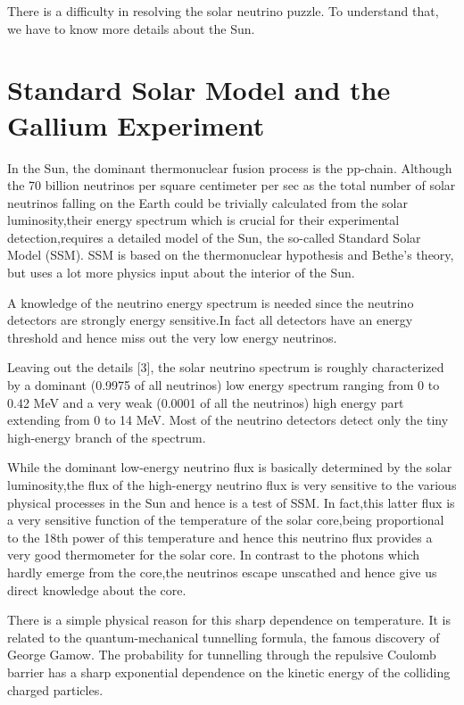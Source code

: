 There is a difficulty in resolving the solar neutrino puzzle. To understand
that, we have to know more details about the Sun.

\newpage

\section{Standard Solar Model and the Gallium Experiment}

In the Sun, the dominant thermonuclear fusion process is the pp-chain.
Although the 70 billion neutrinos per square centimeter per sec as the total
number of solar neutrinos falling on the Earth could be trivially calculated
from the solar luminosity,their energy spectrum which is crucial for their
experimental detection,requires a detailed model of the Sun, the so-called
Standard Solar Model (SSM). SSM is based on the thermonuclear hypothesis
and Bethe’s theory, but uses a lot more physics input about the interior of
the Sun.

A knowledge of the neutrino energy spectrum is needed since the neutrino
detectors are strongly energy sensitive.In fact all detectors have an energy
threshold and hence miss out the very low energy neutrinos.

Leaving out the details [3], the solar neutrino spectrum is roughly characterized by a dominant (0.9975 of all neutrinos) low energy spectrum ranging
from 0 to 0.42 MeV and a very weak (0.0001 of all the neutrinos) high energy
part extending from 0 to 14 MeV. Most of the neutrino detectors detect only
the tiny high-energy branch of the spectrum.

While the dominant low-energy neutrino flux is basically determined by
the solar luminosity,the flux of the high-energy neutrino flux is very sensitive
to the various physical processes in the Sun and hence is a test of SSM.
In fact,this latter flux is a very sensitive function of the temperature of the
solar core,being proportional to the 18th power of this temperature and hence
this neutrino flux provides a very good thermometer for the solar core. In
contrast to the photons which hardly emerge from the core,the neutrinos
escape unscathed and hence give us direct knowledge about the core.

There is a simple physical reason for this sharp dependence on temperature. It is related to the quantum-mechanical tunnelling formula, the famous
discovery of George Gamow. The probability for tunnelling through the repulsive Coulomb barrier has a sharp exponential dependence on the kinetic
energy of the colliding charged particles.

